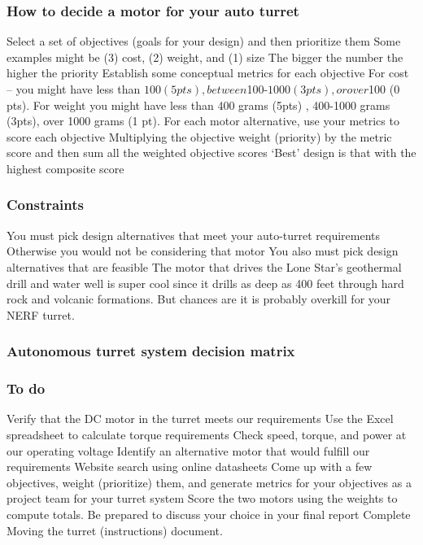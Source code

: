 \documentclass[aspectratio=169]{beamer}
\begin{document}
\begin{frame}
\frametitle{How to decide a motor for your auto turret}
Select a set of objectives (goals for your design) and then prioritize them
Some examples might be (3) cost, (2) weight, and (1) size
The bigger the number the higher the priority
Establish some conceptual metrics for each objective
For cost – you might have less than $100 (5 pts), between $100-$1000 (3 pts), or over $100 (0 pts).  For weight you might have less than 400 grams (5pts) , 400-1000 grams (3pts), over 1000 grams (1 pt). 
For each motor alternative, use your metrics to score each objective 
Multiplying the objective weight (priority) by the metric score and then sum all the weighted objective scores
‘Best’ design is that with the highest composite score
\end{frame}

\begin{frame}
\frametitle{Constraints}
You must pick design alternatives that meet your auto-turret requirements
Otherwise you would not be considering that motor
You also must pick design alternatives that are feasible
The motor that drives the Lone Star's geothermal drill and water well is super cool since it drills as deep as 400 feet through hard rock and volcanic formations.  But chances are it is probably overkill for your NERF turret.
\end{frame}

\begin{frame}
\frametitle{Autonomous turret system decision matrix}
\end{frame}

\begin{frame}
\frametitle{To do}
Verify that the DC motor in the turret meets our requirements 
Use the Excel spreadsheet to calculate torque requirements
Check speed, torque, and power at our operating voltage
Identify an alternative motor that would fulfill our requirements
Website search using online datasheets
Come up with a few objectives, weight (prioritize) them, and generate metrics for your objectives as a project team for your turret system
Score the two motors using the weights to compute totals. 
Be prepared to discuss your choice in your final report
Complete Moving the turret (instructions) document.
\end{frame}
\end{document}
